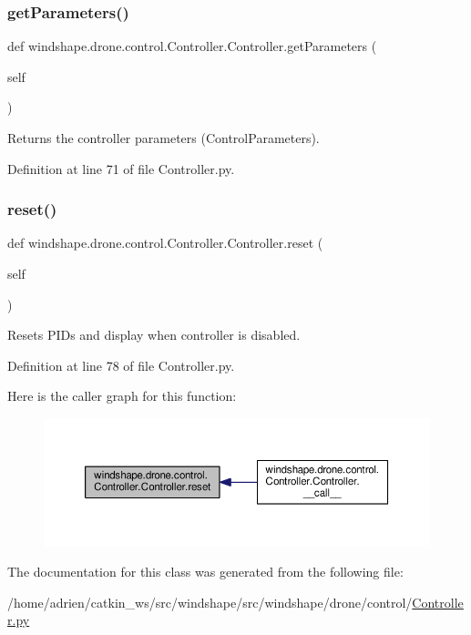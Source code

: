 \subsubsection{\texorpdfstring{get\+Parameters()}{getParameters()}}
{\footnotesize\ttfamily def windshape.\+drone.\+control.\+Controller.\+Controller.\+get\+Parameters (\begin{DoxyParamCaption}\item[{}]{self }\end{DoxyParamCaption})}

\begin{DoxyVerb}Returns the controller parameters (ControlParameters).\end{DoxyVerb}
 

Definition at line 71 of file Controller.\+py.

\mbox{\label{classwindshape_1_1drone_1_1control_1_1_controller_1_1_controller_a94c618838ae2420a234f0d9d884c36d4}} 
\subsubsection{\texorpdfstring{reset()}{reset()}}
{\footnotesize\ttfamily def windshape.\+drone.\+control.\+Controller.\+Controller.\+reset (\begin{DoxyParamCaption}\item[{}]{self }\end{DoxyParamCaption})}

\begin{DoxyVerb}Resets PIDs and display when controller is disabled.\end{DoxyVerb}
 

Definition at line 78 of file Controller.\+py.

Here is the caller graph for this function\+:\nopagebreak
\begin{figure}[H]
\begin{center}
\leavevmode
\includegraphics[width=350pt]{classwindshape_1_1drone_1_1control_1_1_controller_1_1_controller_a94c618838ae2420a234f0d9d884c36d4_icgraph}
\end{center}
\end{figure}


The documentation for this class was generated from the following file\+:\begin{DoxyCompactItemize}
\item 
/home/adrien/catkin\+\_\+ws/src/windshape/src/windshape/drone/control/\mbox{\hyperlink{_controller_8py}{Controller.\+py}}\end{DoxyCompactItemize}
